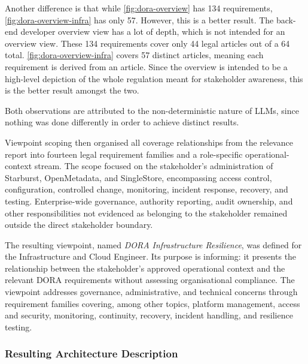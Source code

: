 Another difference is that while \ref{fig:dora-overview} has 134 requirements, \ref{fig:dora-overview-infra} has only 57. However, this is a better result. The back-end developer overview view has a lot of depth, which is not intended for an overview view. These 134 requirements cover only 44 legal articles out of a 64 total. \ref{fig:dora-overview-infra} covers 57 distinct articles, meaning each requirement is derived from an article. Since the overview is intended to be a high-level depiction of the whole regulation meant for stakeholder awareness, this is the better result amongst the two.

Both observations are attributed to the non-deterministic nature of \ac{LLM}s, since nothing was done differently in order to achieve distinct results.

Viewpoint scoping then organised all coverage relationships from the relevance report into fourteen legal requirement families and a role-specific operational-context stream. The scope focused on the stakeholder's administration of Starburst, OpenMetadata, and SingleStore, encompassing access control, configuration, controlled change, monitoring, incident response, recovery, and testing. Enterprise-wide governance, authority reporting, audit ownership, and other responsibilities not evidenced as belonging to the stakeholder remained outside the direct stakeholder boundary.

The resulting viewpoint, named \textit{DORA Infrastructure Resilience}, was defined for the Infrastructure and Cloud Engineer. Its purpose is informing: it presents the relationship between the stakeholder's approved operational context and the relevant \ac{DORA} requirements without assessing organisational compliance. The viewpoint addresses governance, administrative, and technical concerns through requirement families covering, among other topics, platform management, access and security, monitoring, continuity, recovery, incident handling, and resilience testing.

\subsubsection{Resulting Architecture Description}
\label{chap:infra-res-AD}

